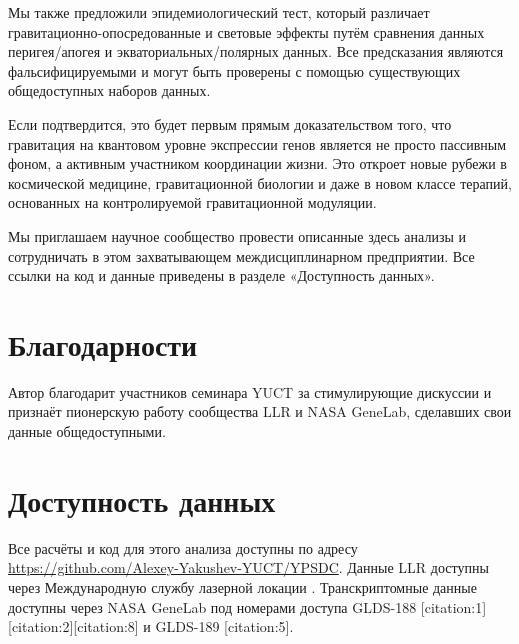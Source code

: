 \documentclass[12pt,a4paper]{article}
\theoremstyle{remark}
\begin{document}
	Мы также предложили эпидемиологический тест, который различает гравитационно-опосредованные и световые эффекты путём сравнения данных перигея/апогея и экваториальных/полярных данных. Все предсказания являются фальсифицируемыми и могут быть проверены с помощью существующих общедоступных наборов данных.
	
	Если подтвердится, это будет первым прямым доказательством того, что гравитация на квантовом уровне экспрессии генов является не просто пассивным фоном, а активным участником координации жизни. Это откроет новые рубежи в космической медицине, гравитационной биологии и даже в новом классе терапий, основанных на контролируемой гравитационной модуляции.
	
	Мы приглашаем научное сообщество провести описанные здесь анализы и сотрудничать в этом захватывающем междисциплинарном предприятии. Все ссылки на код и данные приведены в разделе «Доступность данных».
	
	\section*{Благодарности}
	
	Автор благодарит участников семинара YUCT за стимулирующие дискуссии и признаёт пионерскую работу сообщества LLR и NASA GeneLab, сделавших свои данные общедоступными.
	
	\section*{Доступность данных}
	
	Все расчёты и код для этого анализа доступны по адресу \url{https://github.com/Alexey-Yakushev-YUCT/YPSDC}. Данные LLR доступны через Международную службу лазерной локации \cite{ILRS}. Транскриптомные данные доступны через NASA GeneLab \cite{NASA-GeneLab} под номерами доступа GLDS-188 [citation:1][citation:2][citation:8] и GLDS-189 [citation:5].
	
\end{document}
